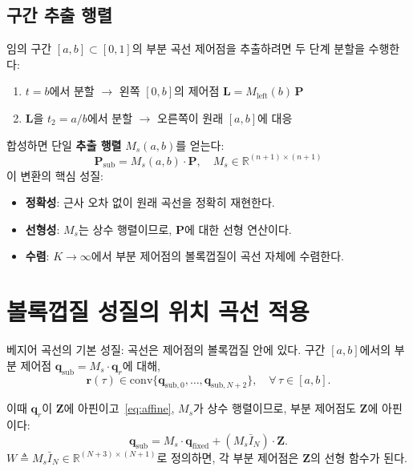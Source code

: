 \documentclass[11pt]{article}
\begin{document}
\subsection{구간 추출 행렬}

임의 구간 $[a,b] \subset [0,1]$의 부분 곡선 제어점을 추출하려면
두 단계 분할을 수행한다:
\begin{enumerate}
  \item $t=b$에서 분할 $\to$ 왼쪽 $[0,b]$의 제어점 $\mathbf{L} = M_{\mathrm{left}}(b)\,\mathbf{P}$
  \item $\mathbf{L}$을 $t_2 = a/b$에서 분할 $\to$ 오른쪽이 원래 $[a,b]$에 대응
\end{enumerate}
합성하면 단일 \textbf{추출 행렬} $M_s(a,b)$를 얻는다:
\begin{equation}\label{eq:extraction}
  \boxed{\mathbf{P}_{\mathrm{sub}} = M_s(a,b) \cdot \mathbf{P},
  \quad M_s \in \mathbb{R}^{(n+1)\times(n+1)}}
\end{equation}
이 변환의 핵심 성질:
\begin{itemize}
  \item \textbf{정확성}: 근사 오차 없이 원래 곡선을 정확히 재현한다.
  \item \textbf{선형성}: $M_s$는 상수 행렬이므로, $\mathbf{P}$에 대한 선형 연산이다.
  \item \textbf{수렴}: $K \to \infty$에서 부분 제어점의 볼록껍질이 곡선 자체에 수렴한다.
\end{itemize}

\section{볼록껍질 성질의 위치 곡선 적용}

베지어 곡선의 기본 성질: 곡선은 제어점의 볼록껍질 안에 있다.
구간 $[a,b]$에서의 부분 제어점 $\mathbf{q}_{\mathrm{sub}} = M_s \cdot \mathbf{q}_r$에 대해,
\begin{equation}
  \mathbf{r}(\tau) \in \mathrm{conv}\{\mathbf{q}_{\mathrm{sub},0}, \ldots, \mathbf{q}_{\mathrm{sub},N+2}\},
  \quad \forall\,\tau \in [a,b].
\end{equation}

이때 $\mathbf{q}_r$이 $\mathbf{Z}$에 아핀이고~\eqref{eq:affine},
$M_s$가 상수 행렬이므로, 부분 제어점도 $\mathbf{Z}$에 아핀이다:
\begin{equation}\label{eq:sub_affine}
  \mathbf{q}_{\mathrm{sub}} = M_s \cdot \mathbf{q}_{\mathrm{fixed}}
    + (M_s \bar{I}_N) \cdot \mathbf{Z}.
\end{equation}
$W \triangleq M_s \bar{I}_N \in \mathbb{R}^{(N+3)\times(N+1)}$로 정의하면,
각 부분 제어점은 $\mathbf{Z}$의 선형 함수가 된다.
\end{document}
